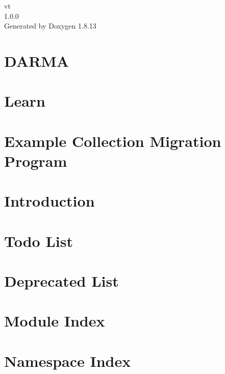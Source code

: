 \documentclass[twoside]{book}
\newcommand{\+}{\discretionary{\mbox{\scriptsize$\hookleftarrow$}}{}{}}
\newcommand{\clearemptydoublepage}{%
  \newpage{\pagestyle{empty}\cleardoublepage}%
}
\begin{document}
\hypersetup{pageanchor=false,
             bookmarksnumbered=true,
             pdfencoding=unicode
            }
\begin{titlepage}
\vspace*{7cm}
\begin{center}%
{\Large vt \\[1ex]\large 1.\+0.\+0 }\\
\vspace*{1cm}
{\large Generated by Doxygen 1.8.13}\\
\end{center}
\end{titlepage}
\clearemptydoublepage
{}
\tableofcontents
\clearemptydoublepage
{}
\hypersetup{pageanchor=true}

\chapter{D\+A\+R\+MA}
\label{index}\hypertarget{index}{}
\chapter{Learn}
\label{learn}

\chapter{Example Collection Migration Program}
\label{migrate-collection-example}

\chapter{Introduction}
\label{introduction}

\chapter{Todo List}
\label{todo}

\chapter{Deprecated List}
\label{deprecated}

\chapter{Module Index}

\chapter{Namespace Index}

\end{document}
